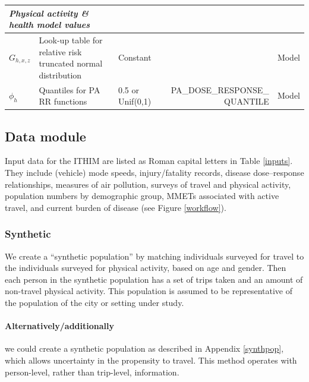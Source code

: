 \documentclass{article}
\begin{document}
\begin{landscape}
\begin{center}
\begin{longtable}{lp{5cm}|lrr}
\hline
\multicolumn{2}{l|}{\textit{Physical activity \& health model values}}\\
\hline
$G_{h,x,z}$  & Look-up table for relative risk truncated normal distribution & Constant &  & Model \\

$\phi_{h}$  & Quantiles for PA RR functions & 0.5 or Unif(0,1) & PA\_DOSE\_RESPONSE\_ QUANTILE & Model \\

\hline
\end{longtable}
\end{center}

\end{landscape}



\subsection{Data module}\label{data}

Input data for the ITHIM are listed as Roman capital letters in Table \ref{inputs}. They include (vehicle) mode speeds, injury/fatality records, disease dose--response relationships, measures of air pollution, surveys of travel and physical activity, population numbers by demographic group, MMETs associated with active travel, and current burden of disease (see Figure \ref{workflow}).

\subsubsection{Synthetic}\label{synth}

We create a ``synthetic population'' by matching individuals surveyed for travel to the individuals surveyed for physical activity, based on age and gender. Then each person in the synthetic population has a set of trips taken and an amount of non-travel physical activity. This population is assumed to be representative of the population of the city or setting under study. 
  
\paragraph{Alternatively/additionally} we could create a synthetic population as described in Appendix \ref{synthpop}, which allows uncertainty in the propensity to travel. %
This method operates with person-level, rather than trip-level, information.
  
\end{document}
